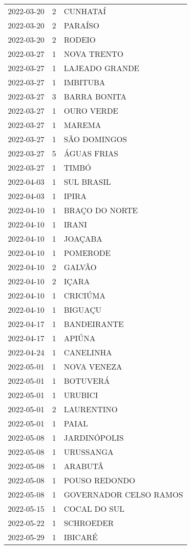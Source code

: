 \documentclass[
	12pt,				%
	openright,			%
	oneside,			%
	a4paper,			%
	english,			%
	french,				%
	spanish,			%
	brazil				%
	dvipsnames, table]{abntex2}
\begin{document}
\begin{longtable}[htbp]{ccl}
2022-03-20 & 2 & CUNHATAÍ \\
2022-03-20 & 2 & PARAÍSO \\
2022-03-20 & 2 & RODEIO \\
2022-03-27 & 1 & NOVA TRENTO \\
2022-03-27 & 1 & LAJEADO GRANDE \\
2022-03-27 & 1 & IMBITUBA \\
2022-03-27 & 3 & BARRA BONITA \\
2022-03-27 & 1 & OURO VERDE \\
2022-03-27 & 1 & MAREMA \\
2022-03-27 & 1 & SÃO DOMINGOS \\
2022-03-27 & 5 & ÁGUAS FRIAS \\
2022-03-27 & 1 & TIMBÓ \\
2022-04-03 & 1 & SUL BRASIL \\
2022-04-03 & 1 & IPIRA \\
2022-04-10 & 1 & BRAÇO DO NORTE \\
2022-04-10 & 1 & IRANI \\
2022-04-10 & 1 & JOAÇABA \\
2022-04-10 & 1 & POMERODE \\
2022-04-10 & 2 & GALVÃO \\
2022-04-10 & 2 & IÇARA \\
2022-04-10 & 1 & CRICIÚMA \\
2022-04-10 & 1 & BIGUAÇU \\
2022-04-17 & 1 & BANDEIRANTE \\
2022-04-17 & 1 & APIÚNA \\
2022-04-24 & 1 & CANELINHA \\
2022-05-01 & 1 & NOVA VENEZA \\
2022-05-01 & 1 & BOTUVERÁ \\
2022-05-01 & 1 & URUBICI \\
2022-05-01 & 2 & LAURENTINO \\
2022-05-01 & 1 & PAIAL \\
2022-05-08 & 1 & JARDINÓPOLIS \\
2022-05-08 & 1 & URUSSANGA \\
2022-05-08 & 1 & ARABUTÃ \\
2022-05-08 & 1 & POUSO REDONDO \\
2022-05-08 & 1 & GOVERNADOR CELSO RAMOS \\
2022-05-15 & 1 & COCAL DO SUL \\
2022-05-22 & 1 & SCHROEDER \\
2022-05-29 & 1 & IBICARÉ \\

\end{longtable}
\end{document}
